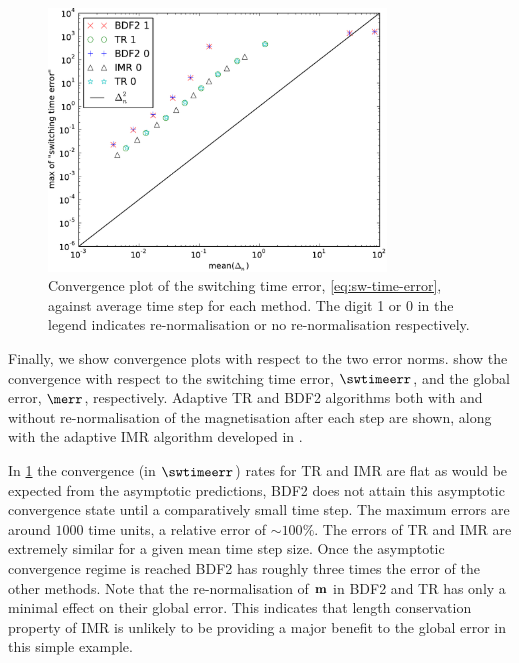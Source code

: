 \begin{figure}
  \centering
  \includegraphics[width=0.8\textwidth]{plots/ode_llg_adaptive_convergence/maxofswitchingtimeerrorvsmeanofdts}
  \caption{Convergence plot of the switching time error, \cref{eq:sw-time-error}, against average time step for each method.
    The digit 1 or 0 in the legend indicates re-normalisation or no re-normalisation respectively.
}
  \label{fig:llg-ode-convergence-swtime}
\end{figure}


Finally, we show convergence plots with respect to the two error norms.
 show the convergence with respect to the switching time error, $\swtimeerr$, and the global error, $\merr$, respectively.
Adaptive TR and BDF2 algorithms both with and without re-normalisation of the magnetisation after
each step are shown, along with the adaptive IMR algorithm developed in .


In \cref{fig:llg-ode-convergence-swtime} the convergence (in $\swtimeerr$) rates for TR and IMR are flat as would be expected from the asymptotic predictions, BDF2 does not attain this asymptotic convergence state until a comparatively small time step.
The maximum errors are around $1000$ time units, a relative error of $\sim 100\%$.
The errors of TR and IMR are extremely similar for a given mean time step size.
Once the asymptotic convergence regime is reached BDF2 has roughly three times the error of the other methods.
Note that the re-normalisation of $\boldsymbol{\mathrm{m}}$ in BDF2 and TR has only a minimal effect on their global error.
This indicates that length conservation property of IMR is unlikely to be providing a major benefit to the global error in this simple example.


